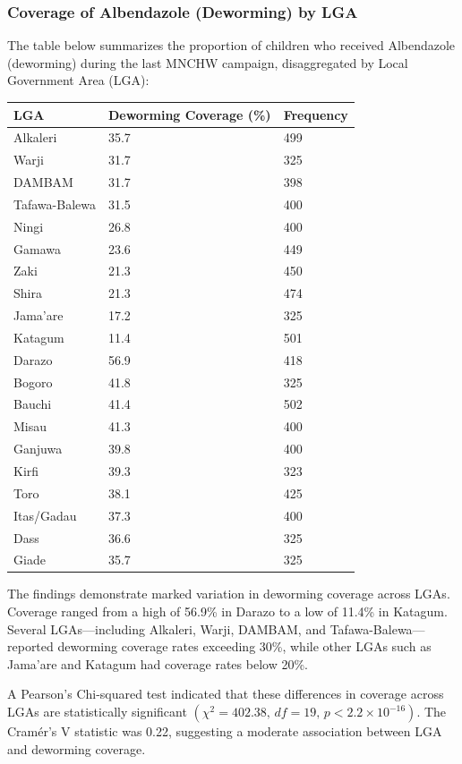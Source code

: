 \documentclass[
  11pt,
]{report}
\begin{document}
\subsubsection{Coverage of Albendazole (Deworming) by
LGA}\label{coverage-of-albendazole-deworming-by-lga}

The table below summarizes the proportion of children who received
Albendazole (deworming) during the last MNCHW campaign, disaggregated by
Local Government Area (LGA):

\begin{longtable}[]{@{}lll@{}}
\toprule\noalign{}
LGA & Deworming Coverage (\%) & Frequency \\
\midrule\noalign{}
\endhead
\bottomrule\noalign{}
\endlastfoot
Alkaleri & 35.7 & 499 \\
Warji & 31.7 & 325 \\
DAMBAM & 31.7 & 398 \\
Tafawa-Balewa & 31.5 & 400 \\
Ningi & 26.8 & 400 \\
Gamawa & 23.6 & 449 \\
Zaki & 21.3 & 450 \\
Shira & 21.3 & 474 \\
Jama'are & 17.2 & 325 \\
Katagum & 11.4 & 501 \\
Darazo & 56.9 & 418 \\
Bogoro & 41.8 & 325 \\
Bauchi & 41.4 & 502 \\
Misau & 41.3 & 400 \\
Ganjuwa & 39.8 & 400 \\
Kirfi & 39.3 & 323 \\
Toro & 38.1 & 425 \\
Itas/Gadau & 37.3 & 400 \\
Dass & 36.6 & 325 \\
Giade & 35.7 & 325 \\
\end{longtable}

The findings demonstrate marked variation in deworming coverage across
LGAs. Coverage ranged from a high of 56.9\% in Darazo to a low of 11.4\%
in Katagum. Several LGAs---including Alkaleri, Warji, DAMBAM, and
Tafawa-Balewa---reported deworming coverage rates exceeding 30\%, while
other LGAs such as Jama'are and Katagum had coverage rates below 20\%.

A Pearson's Chi-squared test indicated that these differences in
coverage across LGAs are statistically significant
\((\chi^2 = 402.38,\, df = 19,\, p < 2.2 \times 10^{-16})\). The
Cramér's V statistic was 0.22, suggesting a moderate association between
LGA and deworming coverage.
\end{document}
